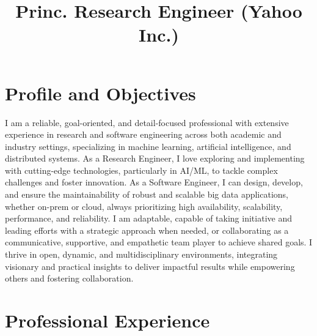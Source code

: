 \documentclass[10pt,a4paper,english]{moderncv}      %
\title{Princ. Research Engineer (Yahoo Inc.)}               %
\begin{document}
\maketitle
\vspace{0.1cm}

\section{Profile and Objectives}

\small I am a reliable, goal-oriented, and detail-focused professional with extensive experience in research and software engineering across both academic and industry settings, specializing in machine learning, artificial intelligence, and distributed systems. As a Research Engineer, I love exploring and implementing with cutting-edge technologies, particularly in AI/ML, to tackle complex challenges and foster innovation. As a Software Engineer, I can design, develop, and ensure the maintainability of robust and scalable big data applications, whether on-prem or cloud, always prioritizing high availability, scalability, performance, and reliability. I am adaptable, capable of taking initiative and leading efforts with a strategic approach when needed, or collaborating as a communicative, supportive, and empathetic team player to achieve shared goals. I thrive in open, dynamic, and multidisciplinary environments, integrating visionary and practical insights to deliver impactful results while empowering others and fostering collaboration.
\vspace{0.2cm}
\section{Professional Experience}


\end{document}
